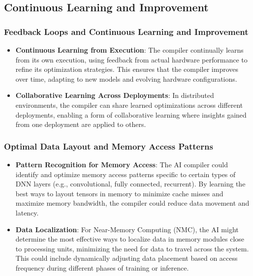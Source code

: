 \documentclass{article}
\begin{document}
\subsection{Continuous Learning and Improvement}

\subsubsection{Feedback Loops and Continuous Learning and Improvement}
\begin{itemize}
    \item \textbf{Continuous Learning from Execution}: The compiler continually learns from its own execution, using feedback from actual hardware performance to refine its optimization strategies. This ensures that the compiler improves over time, adapting to new models and evolving hardware configurations.
    \item \textbf{Collaborative Learning Across Deployments}: In distributed environments, the compiler can share learned optimizations across different deployments, enabling a form of collaborative learning where insights gained from one deployment are applied to others.
\end{itemize}

\subsubsection{Optimal Data Layout and Memory Access Patterns}
\begin{itemize}
    \item \textbf{Pattern Recognition for Memory Access}: The AI compiler could identify and optimize memory access patterns specific to certain types of DNN layers (e.g., convolutional, fully connected, recurrent). By learning the best ways to layout tensors in memory to minimize cache misses and maximize memory bandwidth, the compiler could reduce data movement and latency.
    \item \textbf{Data Localization}: For Near-Memory Computing (NMC), the AI might determine the most effective ways to localize data in memory modules close to processing units, minimizing the need for data to travel across the system. This could include dynamically adjusting data placement based on access frequency during different phases of training or inference.
\end{itemize}
\end{document}
